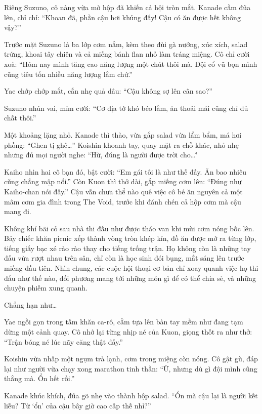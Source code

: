 \documentclass[../main.tex]{subfiles}
\begin{document}
Riêng Suzuno, cô nàng vừa mở hộp đã khiến cả hội tròn mắt. Kanade cầm đũa lên, chỉ chỉ: ``Khoan đã, phần cậu hơi khủng đấy! Cậu có ăn được hết không vậy?''

Trước mặt Suzuno là ba lớp cơm nắm, kèm theo đùi gà nướng, xúc xích, salad trứng, khoai tây chiên và cả miếng bánh flan nhỏ làm tráng miệng. Cô chỉ cười xoà: ``Hôm nay mình tăng cao năng lượng một chút thôi mà. Đội cổ vũ bọn mình cũng tiêu tốn nhiều năng lượng lắm chứ.''

Yae chớp chớp mắt, cắn nhẹ quả dâu: ``Cậu không sợ lên cân sao?''

Suzuno nhún vai, mỉm cười: ``Cơ địa tớ khó béo lắm, ăn thoải mái cũng chỉ đủ chất thôi.''

Một khoảng lặng nhỏ. Kanade thì thào, vừa gắp salad vừa lẩm bẩm, má hơi phồng: ``Ghen tị ghê\dots'' Koishin khoanh tay, quay mặt ra chỗ khác, nhỏ nhẹ nhưng đủ mọi người nghe: ``Hừ, đúng là người được trời cho\dots\''

Kaiho nhìn hai cô bạn đó, bật cười: ``Em gái tôi là như thế đấy. Ăn bao nhiêu cũng chẳng mập nổi.'' Còn Kuon thì thở dài, gắp miếng cơm lên: ``Đúng như Kaiho-chan nói đấy.'' Cậu vẫn chưa thể nào quê việc cô bé ăn nguyên cả một mâm cơm gia đình trong The Void, trước khi đánh chén cả hộp cơm mà cậu mang đi.

\ct

Không khí bãi cỏ sau nhà thi đấu như được tháo van khi mùi cơm nóng bốc lên. Bảy chiếc khăn picnic xếp thành vòng tròn khép kín, đồ ăn được mở ra từng lớp, tiếng giấy bạc xé rào rào thay cho tiếng trống trận. Họ không còn là những tay đấu vừa rượt nhau trên sân, chỉ còn là học sinh đói bụng, mắt sáng lên trước miếng đầu tiên. Nhìn chung, các cuộc hội thoại cơ bản chỉ xoay quanh việc họ thi đấu như thế nào, đối phương mang tới những món gì để có thể chia sẻ, và những chuyện phiếm xung quanh.

Chẳng hạn như\dots

\il

Yae ngồi gọn trong tấm khăn ca-rô, cằm tựa lên bàn tay mềm như đang tạm dừng một cảnh quay. Cô nhớ lại từng nhịp né của Kuon, giọng thốt ra như thở: ``Trận bóng né lúc nãy căng thật đấy.''

Koishin vừa nhấp một ngụm trà lạnh, cơm trong miệng còn nóng. Cô gật gù, đáp lại như người vừa chạy xong marathon tinh thần: ``Ừ, nhưng dù gì đội mình cũng thắng mà. Ổn hết rồi.''

Kanade khúc khích, đũa gõ nhẹ vào thành hộp salad. ``Ổn mà cậu lại là người kết liễu? Từ `ổn' của cậu bây giờ cao cấp thế nhỉ?''
\end{document}
